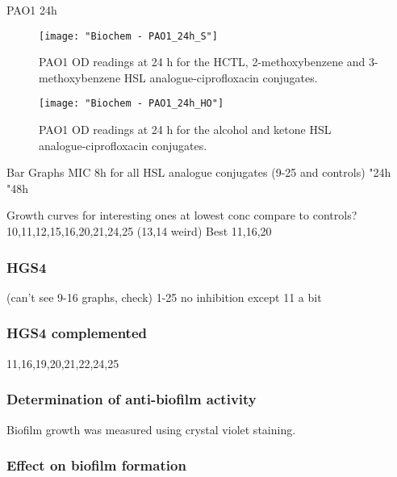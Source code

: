 PAO1 24h

\begin{figure}[H]
	\begin{center}
		\texttt{[image: "Biochem - PAO1\_24h\_S"]}
		\caption{PAO1 OD readings at 24 h for the HCTL, 2-methoxybenzene and 3-methoxybenzene HSL analogue-ciprofloxacin conjugates.\label{fgr:PAO1_24h_S}}
	\end{center}
\end{figure}

\begin{figure}[H]
	\begin{center}
		\texttt{[image: "Biochem - PAO1\_24h\_HO"]}
		\caption{PAO1 OD readings at 24 h for the alcohol and ketone HSL analogue-ciprofloxacin conjugates.\label{fgr:PAO1_24h_HO}}
	\end{center}
\end{figure}

Bar Graphs
MIC 8h for all HSL analogue conjugates (9-25 and controls)
"24h
"48h

Growth curves for interesting ones at lowest conc compare to controls?
10,11,12,15,16,20,21,24,25 (13,14 weird)
Best 11,16,20






\subsubsection{HGS4}
(can't see 9-16 graphs, check)
1-25 no inhibition
except 11 a bit




\subsubsection{HGS4 complemented}

11,16,19,20,21,22,24,25

\subsubsection{Determination of anti-biofilm activity}

Biofilm growth was measured using crystal violet staining\cite{OToole1998}.

\subsubsection{Effect on biofilm formation}





